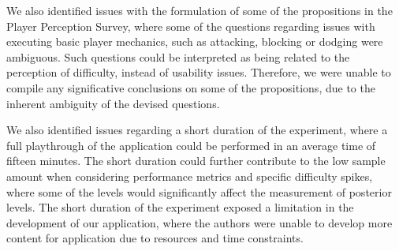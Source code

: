 We also identified issues with the formulation of some of the propositions in the Player Perception Survey, where some of the questions regarding issues with executing basic player mechanics, such as attacking, blocking or dodging were ambiguous. Such questions could be interpreted as being related to the perception of difficulty, instead of usability issues. Therefore, we were unable to compile any significative conclusions on some of the propositions, due to the inherent ambiguity of the devised questions.

We also identified issues regarding a short duration of the experiment, where a full playthrough of the application could be performed in an average time of fifteen minutes. The short duration could further contribute to the low sample amount when considering performance metrics and specific difficulty spikes, where some of the levels would significantly affect the measurement of posterior levels. The short duration of the experiment exposed a limitation in the development of our application, where the authors were unable to develop more content for application due to resources and time constraints.


